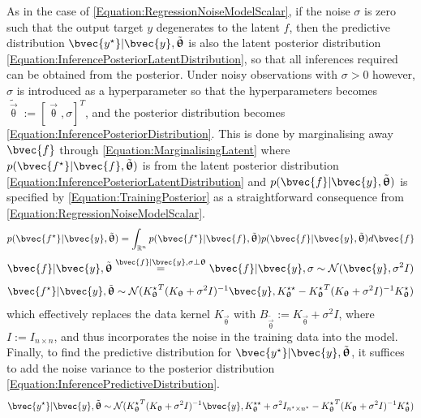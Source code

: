 				As in the case of \eqref{Equation:RegressionNoiseModelScalar}, if the noise $\sigma$ is zero such that the output target $y$ degenerates to the latent $f$, then the predictive distribution $\bvec{y^{\star}} | \bvec{y}, \tilde{\vec{\uptheta}}$ is also the latent posterior distribution \eqref{Equation:InferencePosteriorLatentDistribution}, so that all inferences required can be obtained from the posterior. Under noisy observations with $\sigma > 0$ however, $\sigma$ is introduced as a hyperparameter so that the hyperparameters becomes $\tilde{\vec{\uptheta}} := [\vec{\uptheta}, \sigma]^{T}$, and the posterior distribution becomes \eqref{Equation:InferencePosteriorDistribution}. This is done by marginalising away $\bvec{f}$ through \eqref{Equation:MarginalisingLatent} where $p(\bvec{f^{\star}} | \bvec{f}, \tilde{\vec{\uptheta}})$ is from the latent posterior distribution \eqref{Equation:InferencePosteriorLatentDistribution} and $p(\bvec{f} | \bvec{y}, \tilde{\vec{\uptheta}})$ is specified by \eqref{Equation:TrainingPosterior} as a straightforward consequence from \eqref{Equation:RegressionNoiseModelScalar}. \begin{equation}
					p(\bvec{f^{\star}} | \bvec{y}, \tilde{\vec{\uptheta}}) = \int_{\mathbb{R}^{n}} p(\bvec{f^{\star}} | \bvec{f}, \tilde{\vec{\uptheta}}) p(\bvec{f} | \bvec{y}, \tilde{\vec{\uptheta}}) d\bvec{f}
				\label{Equation:MarginalisingLatent}
				\end{equation} \begin{equation}
					\bvec{f} | \bvec{y}, \tilde{\vec{\uptheta}} \stackrel{\bvec{f} | \bvec{y}, \sigma \perp \vec{\uptheta}}{=} \bvec{f} | \bvec{y}, \sigma \sim \mathcal{N}(\bvec{y}, \sigma^{2} I)
				\label{Equation:TrainingPosterior}
				\end{equation} \begin{equation}
					\bvec{f^{\star}} | \bvec{y}, \tilde{\vec{\uptheta}} \sim \mathcal{N}({K_{\vec{\uptheta}}^{\star}}^{T} (K_{\vec{\uptheta}} + \sigma^{2} I)^{-1} \bvec{y}, K_{\vec{\uptheta}}^{\star \star} - {K_{\vec{\uptheta}}^{\star}}^{T} (K_{\vec{\uptheta}} + \sigma^{2} I)^{-1} K_{\vec{\uptheta}}^{\star})
				\label{Equation:InferencePosteriorDistribution}
				\end{equation} which effectively replaces the data kernel $K_{\vec{\uptheta}}$ with $B_{\tilde{\vec{\uptheta}}} := K_{\vec{\uptheta}} + \sigma^{2} I$, where $I := I_{n \times n}$, and thus incorporates the noise in the training data into the model. Finally, to find the predictive distribution for $\bvec{y^{\star}} | \bvec{y}, \tilde{\vec{\uptheta}}$, it suffices to add the noise variance to the posterior distribution \eqref{Equation:InferencePredictiveDistribution}. \begin{equation}
					\bvec{y^{\star}} | \bvec{y}, \tilde{\vec{\uptheta}} \sim \mathcal{N}({K_{\vec{\uptheta}}^{\star}}^{T} (K_{\vec{\uptheta}} + \sigma^{2} I)^{-1} \bvec{y}, K_{\vec{\uptheta}}^{\star \star} + \sigma^{2} I_{n^{\star} \times n^{\star}} - {K_{\vec{\uptheta}}^{\star}}^{T} (K_{\vec{\uptheta}} + \sigma^{2} I)^{-1} K_{\vec{\uptheta}}^{\star})
				\label{Equation:InferencePredictiveDistribution}
				\end{equation}
								
